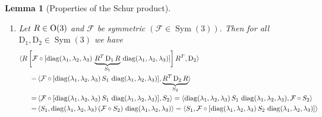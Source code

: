 \documentclass[10pt]{article}
\newcounter{theoremCounter}
\numberwithin{theoremCounter}{section}
\theoremstyle{plain}
\newtheorem{lem}[theoremCounter]{Lemma}
\theoremstyle{definition}
\newcommand{\norm}[1]{\lVert #1 \rVert}
\newcommand{\OO}{{\rm O}}
\newcommand{\DD}{\mathrm{D}}
\DeclareMathOperator{\diag}{diag}
\DeclareMathOperator{\Sym}{Sym}
\numberwithin{equation}{section}
\begin{document}
\begin{appendix}
\begin{lem}[Properties of the Schur product]
\begin{enumerate}
		\begin{align}
		\langle \mathcal{L} \circ A , A \rangle &= \sum_{i,j = 1}^n (\mathcal{L}_{ij} \, A_{ij}) \, A_{ij} \ge \sum_{i,j=1}^n \underset{i,j}{\min}(\mathcal{L}_{ij}) |A_{ij}|^2 = \underset{i,j}{\min}(\mathcal{L}_{ij}) \, \norm{A}^2, \\
		\langle \mathcal{L} \circ A , B \rangle &= \sum_{i,j=1}^n (\mathcal{L}_{ij} \, A_{ij}) \, B_{ij} = \sum_{i,j=1}^n A_{ij} \, (\mathcal{L}_{ij} \, B_{ij}) = \langle A, \mathcal{L} \circ B \rangle.
		\end{align}
	\item Let $R \in \OO(3)$ and $\mathcal{F}$ be symmetric $(\mathcal{F} \in \Sym(3))$. Then for all $\DD_1, \DD_2 \in \Sym(3)$ we have
		\begin{align}
		\langle R \, \bigg[\mathcal{F} &\circ [\diag(\lambda_1, \lambda_2, \lambda_3) \, \underbrace{R^T \, \DD_1 \, R}_{S_1} \, \diag(\lambda_1, \lambda_2, \lambda_3)]\bigg] \, R^T, \DD_2 \rangle \notag \\
		= \, &\langle \mathcal{F} \circ [\diag(\lambda_1, \lambda_2, \lambda_3) \, S_1 \, \diag(\lambda_1, \lambda_2, \lambda_3)], \underbrace{R^T \, \DD_2 \, R}_{S_2} \rangle \\
		= \, &\langle \mathcal{F} \circ [\diag(\lambda_1, \lambda_2, \lambda_3) \, S_1 \, \diag(\lambda_1, \lambda_2, \lambda_3)], S_2 \rangle = \langle \diag(\lambda_1, \lambda_2, \lambda_3) \, S_1 \, \diag(\lambda_1, \lambda_2, \lambda_3), \mathcal{F} \circ S_2 \rangle \notag \\
		= \, &\langle S_1, \diag(\lambda_1, \lambda_2, \lambda_3) \, (\mathcal{F} \circ S_2) \, \diag(\lambda_1, \lambda_2, \lambda_3) \rangle = \langle S_1, \mathcal{F} \circ [\diag(\lambda_1, \lambda_2, \lambda_3) \, S_2 \, \diag(\lambda_1, \lambda_2, \lambda_3)] \rangle \notag
		\end{align}
	\end{enumerate}
\end{lem}
%

\end{appendix}
\end{document}
